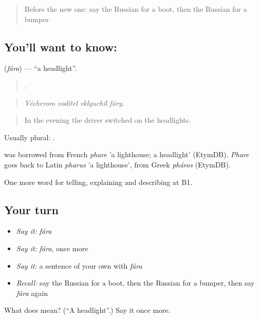\begin{quote}
Before the new one: say the Russian for a boot, then the Russian for a bumper.
\end{quote}

\subsection*{You'll want to know: }
\textbf{} (\emph{fára}) — \textquotedblleft{}a headlight\textquotedblright{}.

\begin{quote}
   .
\end{quote}

\begin{quote}
\emph{Vécherom vodítel vklyuchíl fáry.}
\end{quote}

\begin{quote}
In the evening the driver switched on the headlights.
\end{quote}

Usually plural: \emph{}.

\begin{cousinweb}
\emph{} was borrowed from French \emph{phare} 'a lighthouse; a headlight' (EtymDB). \emph{Phare} goes back to Latin \emph{pharus} 'a lighthouse', from Greek \emph{pháros} (EtymDB).
\end{cousinweb}

\begin{grammarlens}[title={What you've built}]
One more word for telling, explaining and describing at B1.
\end{grammarlens}

\subsection*{Your turn}
\begin{itemize}
\raggedright
  \item \emph{Say it:} \emph{fára}
  \item \emph{Say it:} \emph{fára}, once more
  \item \emph{Say it:} a sentence of your own with \emph{fára}
  \item \emph{Recall:} say the Russian for a boot, then the Russian for a bumper, then say \emph{fára} again
\end{itemize}

\begin{tcolorbox}[breakable,colback=teal!4,colframe=teal!35!black,title={Before you move on}]
What does  mean? (\textquotedblleft{}A headlight\textquotedblright{}.) Say it once more.
\end{tcolorbox}
